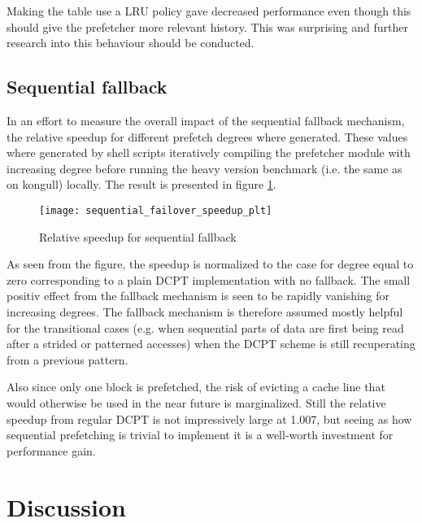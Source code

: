 \documentclass[12pt,journal,compsoc]{IEEEtran}
\begin{document}
Making the table use a LRU policy gave decreased performance even though this
should give the prefetcher more relevant history. This was surprising and
further research into this behaviour should be conducted.

\subsection{Sequential fallback}
In an effort to measure the overall impact of the sequential fallback
mechanism, the relative speedup for different prefetch degrees where
generated. These values where generated by shell scripts iteratively
compiling the prefetcher module with increasing degree before running
the heavy version benchmark (i.e. the same as on kongull) locally. The
result is presented in figure \ref{fig:fallback}.

\begin{figure}
\begin{center}
\texttt{[image: sequential\_failover\_speedup\_plt]}
\end{center}
\caption{\label{fig:fallback} Relative speedup for sequential fallback}
\end{figure}

As seen from the figure, the speedup is normalized to the case for degree equal
to zero corresponding to a plain DCPT implementation with no fallback. The
small positiv effect from the fallback mechanism is seen to be rapidly
vanishing for increasing degrees. The fallback mechanism is therefore assumed
mostly helpful for the transitional cases (e.g. when sequential parts of data
are first being read after a strided or patterned accesses) when the DCPT
scheme is still recuperating from a previous pattern.

Also since only one block is prefetched, the risk of evicting a cache line
that would otherwise be used in the near future is marginalized. Still the
relative speedup from regular DCPT is not impressively large at 1.007, but
seeing as how sequential prefetching is trivial to implement it is a
well-worth investment for performance gain.

\section{Discussion}
\end{document}
